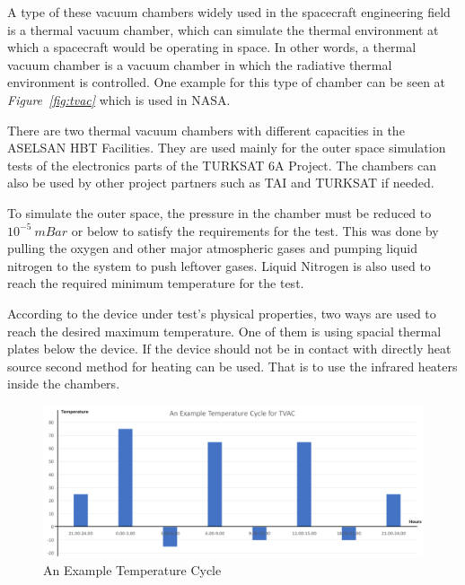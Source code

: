 	A type of these vacuum chambers widely used in the spacecraft engineering field is a thermal vacuum chamber, which can simulate the thermal environment at which a spacecraft would be operating in space. In other words,	a thermal vacuum chamber is a vacuum chamber in which the radiative thermal environment is controlled. One example for this type of chamber can be seen at \textit{Figure~\ref{fig:tvac}} which is used in NASA.


	There are two thermal vacuum chambers with different capacities in the ASELSAN HBT Facilities. They are used mainly for the outer space simulation tests of the electronics parts of the TURKSAT 6A Project. The chambers can also be used by other project partners such as TAI and TURKSAT if needed.
	
	To simulate the outer space, the pressure in the chamber must be reduced to $10^{-5}~mBar$ or below to satisfy the requirements for the test. This was done by pulling the oxygen and other major atmospheric gases and pumping liquid nitrogen to the system to push leftover gases. Liquid Nitrogen is also used to reach the required minimum temperature for the test.
	
	According to the device under test's physical properties, two ways are used to reach the desired maximum temperature. One of them is using spacial thermal plates below the device. If the device should not be in contact with directly heat source second method for heating can be used.  That is to use the infrared heaters inside the chambers.
	
\begin{figure}[H]
	\center
	\setlength{\unitlength}{\textwidth} 
	\includegraphics[width=1.0\unitlength]{tvac-cycle}
	\caption{\label{fig:tvac-cycle}An Example Temperature Cycle }
\end{figure}


